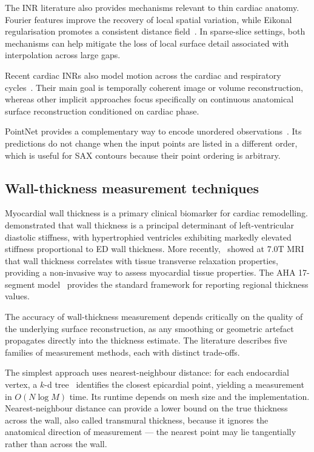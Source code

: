 The INR literature also provides mechanisms relevant to thin cardiac anatomy.
Fourier features improve the recovery of local spatial variation, while Eikonal
regularisation promotes a consistent distance field~\parencite{tancik2020fourierfeatures,gropp2020igr}. In sparse-slice settings,
both mechanisms can help mitigate the loss of local surface detail associated
with interpolation across large gaps.

Recent cardiac INRs also model motion across the cardiac and respiratory cycles~\parencite{kunz2024fourierinr,quillien2025sensorfree,wang2025dvrnemf,tian2026mocoinr}.
Their main goal is temporally coherent image or volume reconstruction, whereas
other implicit approaches focus specifically on continuous anatomical surface
reconstruction conditioned on cardiac phase.

PointNet provides a complementary way to encode unordered observations~\parencite{qi2017pointnet}. Its predictions do not change when the input points
are listed in a different order, which is useful for SAX contours because their
point ordering is arbitrary.

\subsection{Wall-thickness measurement techniques}
\label{subsec:thickness-review}

\noindent
Myocardial wall thickness is a primary clinical biomarker for cardiac
remodelling. \textcite{grossman1974wallthickness} demonstrated that wall
thickness is a principal determinant of left-ventricular diastolic stiffness,
with hypertrophied ventricles exhibiting markedly elevated stiffness
proportional to ED wall thickness. More recently,~\textcite{huelnhagen2017t2wallthickness} showed at 7.0T MRI that wall thickness
correlates with tissue transverse relaxation properties, providing a non-invasive
way to assess myocardial tissue properties. The AHA 17-segment
model~\parencite{cerqueira2002segmentation} provides the standard framework for
reporting regional thickness values.

The accuracy of wall-thickness measurement depends critically on the quality of
the underlying surface reconstruction, as any smoothing or geometric artefact
propagates directly into the thickness estimate. The literature describes
five families of measurement methods, each with distinct trade-offs.

The simplest approach uses nearest-neighbour distance: for each endocardial
vertex, a $k$-d tree~\parencite{bentley1975kdtree} identifies the closest
epicardial point, yielding a measurement
in $O(N \log M)$ time. Its runtime depends on mesh size and the implementation.
Nearest-neighbour distance can provide a lower bound on the true thickness
across the wall, also called transmural thickness, because it ignores the
anatomical direction of measurement --- the
nearest point may lie tangentially rather than across the wall.

